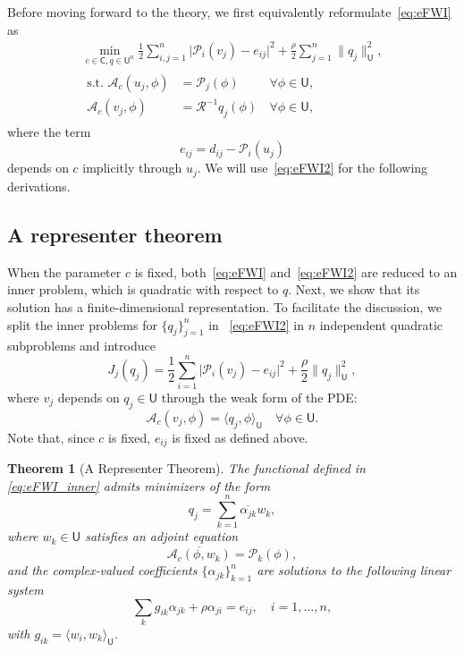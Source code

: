 \documentclass[12pt]{amsart}
\newtheorem{thm}{Theorem}
\begin{document}
Before moving forward to the theory, we first equivalently reformulate~\eqref{eq:eFWI} as
\begin{eqnarray}\label{eq:eFWI2}
\min_{c\in\mathsf{C},q\in\mathsf{U}^n}  {\textstyle\frac{1}{2}} \sum_{i,j=1}^{n}   \big|\mathcal{P}_i(v_j) - e_{ij}\big|^2 +   {\textstyle\frac{\rho}{2}} \sum_{j=1}^n  \|q_j\|_{\mathsf{U}}^2,\\
 \begin{split}
\text{s.t.}\,\,\mathcal{A}_c(u_j,\phi) &= \mathcal{P}_j(\phi)\,&\forall\phi\in \mathsf{U},\nonumber\\
\mathcal{A}_c(v_j,\phi) &= \mathcal{R}^{-1}q_j(\phi)\,&\forall\phi\in \mathsf{U},\nonumber
 \end{split}
 \end{eqnarray}
where the term 
\begin{equation}\label{eq:new_error}
    e_{ij} = d_{ij} - \mathcal{P}_i(u_j)
\end{equation}
depends on $c$ implicitly through $u_j$. We will use~\eqref{eq:eFWI2} for the following derivations.

\subsection{A representer theorem}
When the parameter $c$ is fixed, both~\eqref{eq:eFWI} and~\eqref{eq:eFWI2} are reduced to an inner problem, which is quadratic with respect to $q$. Next, we show that its solution has a finite-dimensional representation. To facilitate the discussion, we split the inner problems for $\{q_j\}_{j=1}^n$ in ~\eqref{eq:eFWI2} in $n$ independent quadratic subproblems and introduce
\begin{equation}\label{eq:eFWI_inner}
J_j(q_j) =  {\textstyle\frac{1}{2}}\sum_{i=1}^{n}   \big|\mathcal{P}_i(v_j) - e_{ij}\big|^2 +   {\textstyle\frac{\rho}{2}}   \|q_j\|_{\mathsf{U}}^2,
\end{equation}
where $v_j$ depends on $q_j\in \mathsf{U}$ through the weak form of the PDE:
\[
\mathcal{A}_c(v_j,\phi) = \langle q_j,\phi \rangle_\mathsf{U}\quad\forall\phi\in \mathsf{U}.
\]
Note that, since $c$ is fixed, $e_{ij}$ is fixed as defined above. 

\begin{thm}[A Representer Theorem]
\label{thm:Representer}
The functional defined in \eqref{eq:eFWI_inner} admits minimizers of the form
\begin{equation}\label{eq:representation}
q_j = \sum_{k=1}^n \overline{\alpha_{jk}}w_k,
\end{equation}
where $w_k \in \mathsf{U}$ satisfies an adjoint equation
\begin{equation}\label{eq:weakadjoint}
\overline{\mathcal{A}_c(\phi, w_k)} = \mathcal{P}_k(\phi),
\end{equation}
and the complex-valued coefficients $\{\alpha_{jk}\}_{k=1}^n$ are solutions to the following linear system
\[
\sum_{k} g_{ik}\alpha_{jk} + \rho \alpha_{ji} = e_{ij},\quad i=1, \ldots, n,
\]
with $g_{ik} = \langle w_i, w_k\rangle_\mathsf{U}$.
\end{thm}
\end{document}
